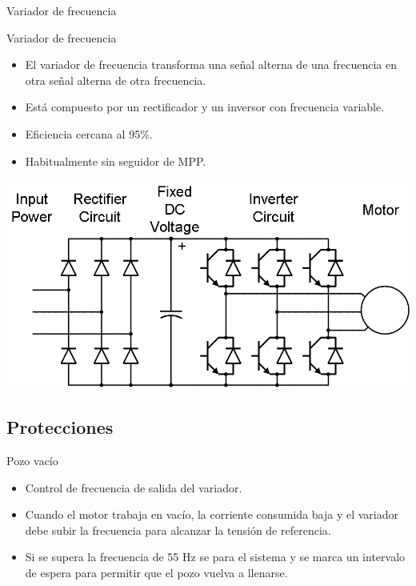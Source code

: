 \documentclass[xcolor={usenames,svgnames,dvipsnames}]{beamer}
\begin{document}
\begin{frame}[label={sec:orgb8e41e6}]{Variador de frecuencia}
\end{frame}
\begin{frame}[label={sec:org7a55c94}]{Variador de frecuencia}
\begin{itemize}
\item El variador de frecuencia \alert{transforma una señal alterna de una frecuencia en otra señal alterna de otra frecuencia}.

\item Está compuesto por un rectificador y un inversor con frecuencia variable.

\item Eficiencia cercana al 95\%.

\item Habitualmente sin seguidor de MPP.
\end{itemize}

\begin{center}
\includegraphics[width=.9\linewidth]{../figs/VariadorFrecuencia_esquema.png}
\end{center}
\end{frame}


\subsection{Protecciones}
\label{sec:org4e8fe5f}

\begin{frame}[label={sec:org4418ebe}]{Pozo vacío}
\begin{itemize}
\item \alert{Control de frecuencia de salida del variador}.

\item Cuando el motor trabaja en vacío, la corriente consumida baja y el variador debe subir la frecuencia para alcanzar la tensión de referencia.

\item Si se supera la frecuencia de 55 Hz se para el sistema y se marca un intervalo de espera para permitir que el pozo vuelva a llenarse.
\end{itemize}
\end{frame}
\end{document}
